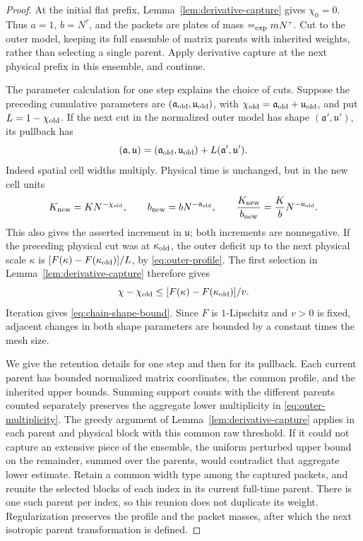 \begin{proof}
At the initial flat prefix, Lemma~\ref{lem:derivative-capture} gives
$\chi_0=0$. Thus $a=1$, $b=N^\tau$, and the packets are plates of mass
$\mathrel{=_{\mathrm{exp}}} mN^\tau$. Cut to the outer model, keeping its full ensemble of
matrix parents with inherited weights, rather than selecting a single
parent. Apply derivative capture at the next physical prefix in this
ensemble, and continue.

The parameter calculation for one step explains the choice of cuts.
Suppose the preceding cumulative parameters are
$(\mathfrak a_{\rm old},\mathfrak u_{\rm old})$, with
$\chi_{\rm old}=\mathfrak a_{\rm old}+\mathfrak u_{\rm old}$, and put $L=1-\chi_{\rm old}$.
If the next cut in the normalized outer model has shape
$(\mathfrak a',\mathfrak u')$, its pullback has
\[
 (\mathfrak a,\mathfrak u)
   =(\mathfrak a_{\rm old},\mathfrak u_{\rm old})
      +L(\mathfrak a',\mathfrak u').
\]
Indeed spatial cell widths multiply. Physical time is unchanged, but
in the new cell units
\[
 K_{\rm new}=K N^{-\chi_{\rm old}},\qquad
 b_{\rm new}=b N^{-\mathfrak a_{\rm old}},\qquad
 \frac{K_{\rm new}}{b_{\rm new}}
   =\frac Kb N^{-\mathfrak u_{\rm old}}.
\]
This also gives the asserted increment in $\mathfrak u$; both increments
are nonnegative. If the preceding physical cut was at $\kappa_{\rm old}$,
the outer deficit up to the next physical scale $\kappa$ is
$[F(\kappa)-F(\kappa_{\rm old})]/L$, by \eqref{eq:outer-profile}.
The first selection in Lemma~\ref{lem:derivative-capture} therefore gives
\[
 \chi-\chi_{\rm old}\le [F(\kappa)-F(\kappa_{\rm old})]/v.
\]
Iteration gives \eqref{eq:chain-shape-bound}. Since $F$ is
$1$-Lipschitz and $v>0$ is fixed, adjacent changes in both shape
parameters are bounded by a constant times the mesh size.

We give the retention details for one step and then for its pullback.
Each current parent has bounded normalized matrix coordinates, the common
profile, and the inherited upper bounds. Summing support counts with the
different parents counted separately preserves the aggregate lower
multiplicity in \eqref{eq:outer-multiplicity}. The greedy argument of
Lemma~\ref{lem:derivative-capture} applies in each parent and physical
block with this common raw threshold. If it could not capture an
extensive piece of the ensemble, the uniform perturbed upper bound on
the remainder, summed over the parents, would contradict that aggregate
lower estimate. Retain a common width type among the captured packets,
and reunite the selected blocks of each index in its current full-time
parent. There is one such parent per index, so this reunion does not
duplicate its weight. Regularization preserves the profile and the packet
masses, after which the next isotropic parent transformation is defined.


\end{proof}
